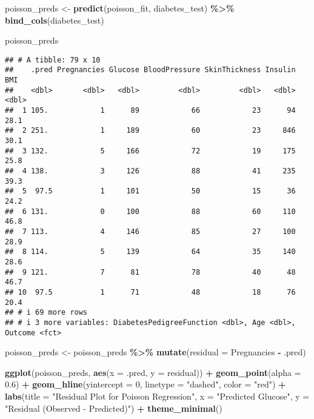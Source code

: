 \documentclass[
]{article}
\newenvironment{Shaded}{\begin{snugshade}}{\end{snugshade}}
\newcommand{\AttributeTok}[1]{\textcolor[rgb]{0.13,0.29,0.53}{#1}}
\newcommand{\DecValTok}[1]{\textcolor[rgb]{0.00,0.00,0.81}{#1}}
\newcommand{\FloatTok}[1]{\textcolor[rgb]{0.00,0.00,0.81}{#1}}
\newcommand{\FunctionTok}[1]{\textcolor[rgb]{0.13,0.29,0.53}{\textbf{#1}}}
\newcommand{\NormalTok}[1]{#1}
\newcommand{\OtherTok}[1]{\textcolor[rgb]{0.56,0.35,0.01}{#1}}
\newcommand{\SpecialCharTok}[1]{\textcolor[rgb]{0.81,0.36,0.00}{\textbf{#1}}}
\newcommand{\StringTok}[1]{\textcolor[rgb]{0.31,0.60,0.02}{#1}}
\begin{document}
\begin{Shaded}
\begin{Highlighting}[]
\NormalTok{poisson\_preds }\OtherTok{\textless{}{-}} \FunctionTok{predict}\NormalTok{(poisson\_fit, diabetes\_test) }\SpecialCharTok{\%\textgreater{}\%}
  \FunctionTok{bind\_cols}\NormalTok{(diabetes\_test)}

\NormalTok{poisson\_preds}
\end{Highlighting}
\end{Shaded}

\begin{verbatim}
## # A tibble: 79 x 10
##    .pred Pregnancies Glucose BloodPressure SkinThickness Insulin   BMI
##    <dbl>       <dbl>   <dbl>         <dbl>         <dbl>   <dbl> <dbl>
##  1 105.            1      89            66            23      94  28.1
##  2 251.            1     189            60            23     846  30.1
##  3 132.            5     166            72            19     175  25.8
##  4 138.            3     126            88            41     235  39.3
##  5  97.5           1     101            50            15      36  24.2
##  6 131.            0     100            88            60     110  46.8
##  7 113.            4     146            85            27     100  28.9
##  8 114.            5     139            64            35     140  28.6
##  9 121.            7      81            78            40      48  46.7
## 10  97.5           1      71            48            18      76  20.4
## # i 69 more rows
## # i 3 more variables: DiabetesPedigreeFunction <dbl>, Age <dbl>, Outcome <fct>
\end{verbatim}

\begin{Shaded}
\begin{Highlighting}[]
\NormalTok{poisson\_preds }\OtherTok{\textless{}{-}}\NormalTok{ poisson\_preds }\SpecialCharTok{\%\textgreater{}\%}
  \FunctionTok{mutate}\NormalTok{(}\AttributeTok{residual =}\NormalTok{ Pregnancies }\SpecialCharTok{{-}}\NormalTok{ .pred)}

\FunctionTok{ggplot}\NormalTok{(poisson\_preds, }\FunctionTok{aes}\NormalTok{(}\AttributeTok{x =}\NormalTok{ .pred, }\AttributeTok{y =}\NormalTok{ residual)) }\SpecialCharTok{+}
  \FunctionTok{geom\_point}\NormalTok{(}\AttributeTok{alpha =} \FloatTok{0.6}\NormalTok{) }\SpecialCharTok{+}
  \FunctionTok{geom\_hline}\NormalTok{(}\AttributeTok{yintercept =} \DecValTok{0}\NormalTok{, }\AttributeTok{linetype =} \StringTok{"dashed"}\NormalTok{, }\AttributeTok{color =} \StringTok{"red"}\NormalTok{) }\SpecialCharTok{+}
  \FunctionTok{labs}\NormalTok{(}\AttributeTok{title =} \StringTok{"Residual Plot for Poisson Regression"}\NormalTok{,}
       \AttributeTok{x =} \StringTok{"Predicted Glucose"}\NormalTok{,}
       \AttributeTok{y =} \StringTok{"Residual (Observed {-} Predicted)"}\NormalTok{) }\SpecialCharTok{+}
  \FunctionTok{theme\_minimal}\NormalTok{()}
\end{Highlighting}
\end{Shaded}
\end{document}
